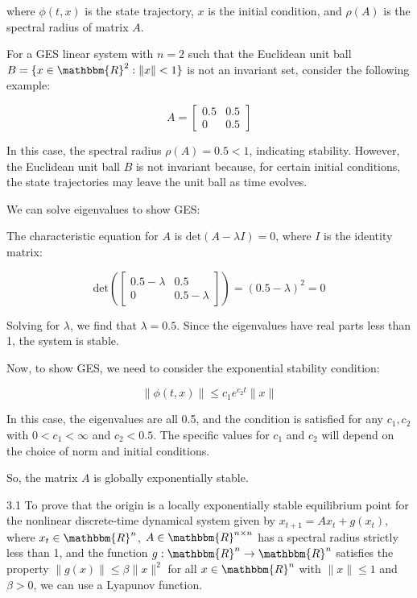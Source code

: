 \documentclass{article}
\begin{document}
where \(\phi(t, x)\) is the state trajectory, \(x\) is the initial condition, and \(\rho(A)\) is the spectral radius of matrix \(A\).

For a GES linear system with \(n = 2\) such that the Euclidean unit ball \(B = \{ x \in \mathbbm{R}^2 : \|x\| < 1 \}\) is not an invariant set, consider the following example:

\[
A = \begin{bmatrix} 0.5 & 0.5 \\ 0 & 0.5 \end{bmatrix}
\]

In this case, the spectral radius \(\rho(A) = 0.5 < 1\), indicating stability. However, the Euclidean unit ball \(B\) is not invariant because, for certain initial conditions, the state trajectories may leave the unit ball as time evolves.

We can solve eigenvalues to show GES:

The characteristic equation for \(A\) is \(\text{det}(A - \lambda I) = 0\), where \(I\) is the identity matrix:

\[ \text{det}\left(\begin{bmatrix} 0.5 - \lambda & 0.5 \\ 0 & 0.5 - \lambda \end{bmatrix}\right) = (0.5 - \lambda)^2 = 0 \]

Solving for \(\lambda\), we find that \(\lambda = 0.5\). Since the eigenvalues have real parts less than 1, the system is stable.

Now, to show GES, we need to consider the exponential stability condition:

\[ \| \phi(t, x) \| \leq c_1 e^{c_2 t} \| x \| \]

In this case, the eigenvalues are all 0.5, and the condition is satisfied for any \(c_1, c_2\) with \(0 < c_1 < \infty\) and \(c_2 < 0.5\). The specific values for \(c_1\) and \(c_2\) will depend on the choice of norm and initial conditions.

So, the matrix \(A\) is globally exponentially stable.

3.1
To prove that the origin is a locally exponentially stable equilibrium point for the nonlinear discrete-time dynamical system given by \(x_{t+1} = A x_t + g(x_t)\), where \(x_t \in \mathbbm{R}^n\), \(A \in \mathbbm{R}^{n \times n}\) has a spectral radius strictly less than 1, and the function \(g : \mathbbm{R}^n \rightarrow \mathbbm{R}^n\) satisfies the property \(\|g(x)\| \leq \beta \|x\|^2\) for all \(x \in \mathbbm{R}^n\) with \(\|x\| \leq 1\) and \(\beta > 0\), we can use a Lyapunov function.
\end{document}
